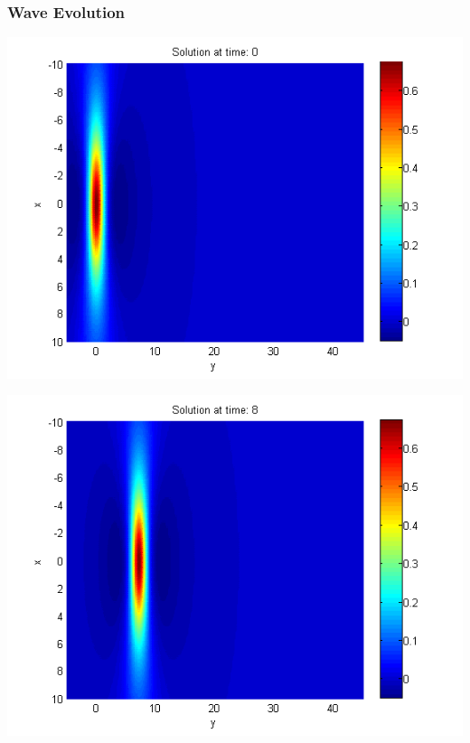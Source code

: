 \documentclass{beamer}
\begin{document}
\begin{frame}
\frametitle{Wave Evolution}
\begin{center}\vspace{0.4cm}
	\begin{minipage}[b]{0.30\linewidth}
		\includegraphics[width=\linewidth]{figures/Solution1_t=0.png}
	\end{minipage}	
	\begin{minipage}[b]{0.30\linewidth}
		\includegraphics[width=\linewidth]{figures/Solution1_t=8.png}
	\end{minipage}	
	\begin{minipage}[b]{0.30\linewidth}

\end{minipage}
\end{center}
\end{frame}
\end{document}

